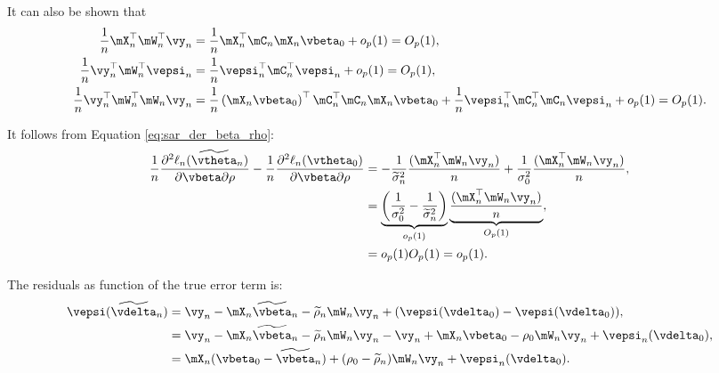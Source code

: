 \documentclass[english,12pt]{book}\usepackage[]{graphicx}\usepackage[]{xcolor}
\begin{document}
\begin{subappendices}
\begin{enumerate}
   It can also be shown that
   \begin{equation}\label{eq:important-bounded-forms}
    \begin{aligned}
      \frac{1}{n}\mX_n^\top\mW_n^\top\vy_n & = \frac{1}{n}\mX_n^\top\mC_n\mX_n\vbeta_0 + o_p(1) = O_p(1),\\
      \frac{1}{n}\vy_n^{\top}\mW_n^{\top}\vepsi_n &= \frac{1}{n}\vepsi_n^\top\mC_n^{\top}\vepsi_n + o_p(1) = O_p(1),\\
      \frac{1}{n}\vy_n^\top\mW_n^\top\mW_n\vy_n & = \frac{1}{n}\left(\mX_n\vbeta_0\right)^\top\mC_n^\top\mC_n\mX_n\vbeta_0 + \frac{1}{n}\vepsi_n^\top\mC_n^\top\mC_n\vepsi_n + o_p(1) = O_p(1).
    \end{aligned}
   \end{equation}
   
   It follows from Equation \eqref{eq:sar_der_beta_rho}:
   \begin{equation*}
    \begin{aligned}
    \frac{1}{n}\frac{\partial^2 \ell_n(\widetilde{\vtheta}_n)}{\partial \vbeta \partial \rho} - \frac{1}{n}\frac{\partial^2 \ell_n(\vtheta_0)}{\partial \vbeta \partial \rho} & = - \frac{1}{\widetilde{\sigma}^2_n}\frac{(\mX^\top_n \mW_n\vy_n)}{n} + \frac{1}{\sigma^2_0}\frac{(\mX^\top_n \mW_n\vy_n)}{n}, \\
    & = \underbrace{\left(\frac{1}{\sigma^2_0} - \frac{1}{\widetilde{\sigma}^2_n}\right)}_{o_p(1)}\underbrace{\frac{(\mX^\top_n \mW_n\vy_n)}{n}}_{O_p(1)}, \\
    & = o_p(1)O_p(1)  = o_p(1).
    \end{aligned}
   \end{equation*} 
   
   The residuals as function of the true error term is:
   \begin{equation}\label{eq:error_slm_lee}
    \begin{aligned}
    \vepsi(\widetilde{\vdelta}_n) & = \vy_n - \mX_n\widetilde{\vbeta}_n - \widetilde{\rho}_n\mW_n\vy_n +(\vepsi(\vdelta_0) -  \vepsi(\vdelta_0)), \\
    & = \vy_n - \mX_n\widetilde{\vbeta}_n - \widetilde{\rho}_n\mW_n\vy_n - \vy_n + \mX_n\vbeta_0 - \rho_0\mW_n\vy_n + \vepsi_n(\vdelta_0), \\
    & = \mX_n(\vbeta_0 - \widetilde{\vbeta}_n) + (\rho_0 - \widetilde{\rho}_n)\mW_n\vy_n + \vepsi_n(\vdelta_0). 
    \end{aligned}
   \end{equation}
   

\end{enumerate}
\end{subappendices}
\end{document}
